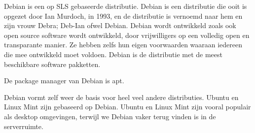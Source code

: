 Debian is een op SLS gebaseerde distributie. Debian is een distributie die ooit is opgezet door Ian Murdoch, in 1993, en de distributie is vernoemd naar hem en zijn vrouw Debra; Deb-Ian ofwel Debian. Debian wordt ontwikkeld zoals ook open source software wordt ontwikkeld, door vrijwilligers op een volledig open en transparante manier. Ze hebben zelfs hun eigen voorwaarden waaraan iedereen die mee ontwikkeld moet voldoen. Debian is de distributie met de meest beschikbare software pakketten.

De package manager van Debian is apt.

Debian vormt zelf weer de basis voor heel veel andere distributies. Ubuntu en Linux Mint zijn gebaseerd op Debian. Ubuntu en Linux Mint zijn vooral populair als desktop omgevingen, terwijl we Debian vaker terug vinden is in de serverruimte.


